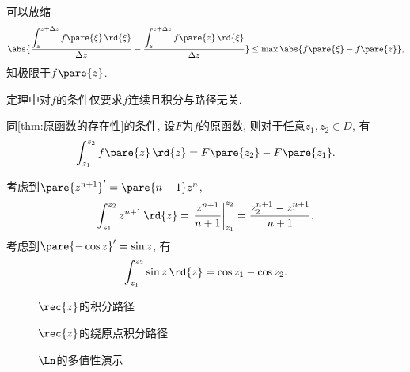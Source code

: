 \documentclass[../ComplexVariable.tex]{subfiles}
\begin{document}
可以放缩
\[ \abs{\frac{\displaystyle \int_z^{z+\Delta z}f\pare{\xi}\,\rd{\xi}}{\Delta z} - \frac{\displaystyle \int_z^{z+\Delta z}f\pare{z}\,\rd{\xi}}{\Delta z}} \le {\max \abs{f\pare{\xi} - f\pare{z}}}, \]
知极限于$f\pare{z}$.
\begin{remark}
    定理中对$f$的条件仅要求$f$连续且积分与路径无关.
\end{remark}
\begin{theorem}
    同\cref{thm:原函数的存在性}的条件, 设$F$为$f$的原函数, 则对于任意$z_1, z_2\in D$, 有
    \[ \int_{z_1}^{z_2}f\pare{z}\,\rd{z} = F\pare{z_2} - F\pare{z_1}. \]
\end{theorem}
\begin{sample}
    \begin{ex}
        考虑到$\pare{z^{n+1}}' = \pare{n+1}z^n$,
        \[ \int_{z_1}^{z_2} z^{n+1}\,\rd{z} = \left.\frac{z^{n+1}}{n+1}\right\vert_{z_1}^{z_2} = \frac{z_2^{n+1} - z_1^{n+1}}{n+1}. \]
        考虑到$\pare{-\cos z}' = \sin z$, 有
        \[ \int_{z_1}^{z_2}\sin z\,\rd{z} = \cos z_1 - \cos z_2. \]
    \end{ex}
\end{sample}
\begin{figure}[ht]
    \centering
    \caption{$\displaystyle \rec{z}$的积分路径}
    \label{fig:1/z的积分路径}
\end{figure}
\begin{figure}[ht]
    \centering
    \caption{$\displaystyle \rec{z}$的绕原点积分路径}
    \label{fig:1/z的绕原点积分路径}
\end{figure}
\begin{figure}[ht]
    \centering
    \caption{$\Ln$的多值性演示}
    \label{fig:Ln的多值性演示}
\end{figure}
\end{document}
